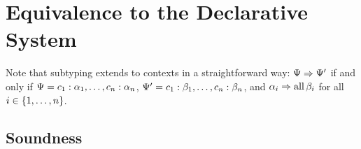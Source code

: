 
\section{Equivalence to the Declarative System}


Note that subtyping extends to contexts in a straightforward way: $\Psi \mathrel\Rightarrow \Psi'$ if and only if $\Psi = c_1 : \alpha_1, \ldots, c_n : \alpha_n$, $\Psi' = c_1 : \beta_1, \ldots, c_n : \beta_n$, and $\alpha_i \mathrel\Rightarrow \operatorname{all}{\beta_i}$ for all $i \in \lbrace1, \ldots, n\rbrace$.


\subsection{Soundness}

